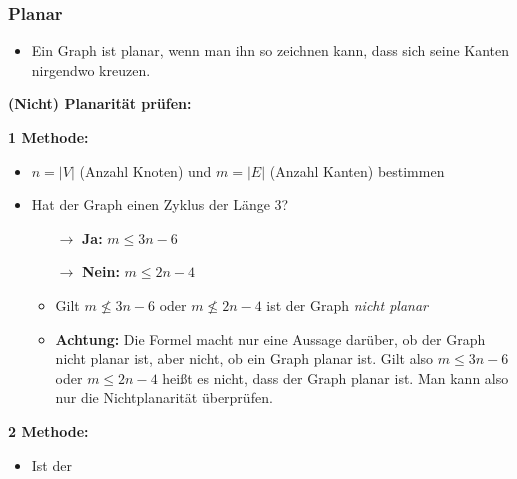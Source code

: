 \newpage

\subsubsection*{Planar}

\begin{itemize}
\item Ein Graph ist planar, wenn man ihn so zeichnen kann, dass sich seine Kanten nirgendwo kreuzen.
\end{itemize}

\textbf{(Nicht) Planarität prüfen:}

\textbf{1 Methode:}

\begin{itemize}
\item $n = |V|$ (Anzahl Knoten) und $m = |E|$ (Anzahl Kanten) bestimmen
\item Hat der Graph einen Zyklus der Länge 3?
	\begin{itemize}
	\item[$\rightarrow$] \textbf{Ja:} $m \leq 3n - 6$
	\item[$\rightarrow$] \textbf{Nein:} $m \leq 2n - 4$
	\item Gilt $m \not \leq 3n - 6$ oder $m \not \leq 2n - 4$ ist der Graph \textit{nicht planar}
	\item \textbf{Achtung:} Die Formel macht nur eine Aussage darüber, ob der Graph nicht planar ist, aber nicht, ob ein Graph planar ist. Gilt also $m \leq 3n - 6$ oder $m \leq 2n - 4$ heißt es nicht, dass der Graph planar ist. Man kann also nur die Nichtplanarität überprüfen.
	\end{itemize}
\end{itemize}

\textbf{2 Methode:}

\begin{itemize}
\item Ist der 
\end{itemize}
